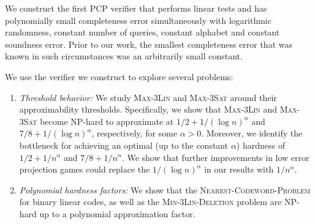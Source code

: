 
We construct the first PCP verifier that performs linear tests and has polynomially small completeness error simultaneously with logarithmic randomness,
constant number of queries, constant alphabet and constant soundness error. 
Prior to our work, the smallest completeness error that was known in such circumstances was an arbitrarily small constant.

We use the verifier we construct to explore several problems:
\begin{enumerate}
\item {\em Threshold behavior:} We study \textsc{Max-3Lin} and \textsc{Max-3Sat} around their approximability thresholds. Specifically, we show that \textsc{Max-3Lin} and \textsc{Max-3Sat} become {\sf NP}-hard to approximate at $1/2 + 1/(\log n)^\alpha$ and $7/8 + 1/(\log n)^{\alpha}$, respectively, for some $\alpha > 0$. Moreover, we identify
the bottleneck for achieving an optimal (up to the constant $\alpha$) hardness of $1/2 + 1/n^{\alpha}$ and $7/8 + 1/n^\alpha$. We show that further improvements in low error projection games could replace the $1/(\log n)^{\alpha}$ in our results with $1/n^\alpha$.

\item {\em Polynomial hardness factors:} We show that the \textsc{Nearest-Codeword-Problem} for binary linear codes, as well as the \textsc{Min-3Lin-Deletion} problem are {\sf NP}-hard up to a polynomial approximation factor.
\end{enumerate}
